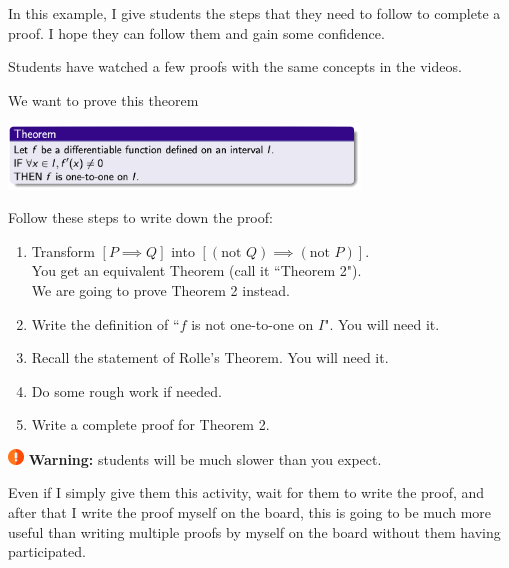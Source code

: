 \documentclass[11pt]{article}
\newcommand {\DS} [1] {${\displaystyle #1}$}
\newcommand{\vv}{\vspace{.5cm}}
\begin{document}
\begin{example}
In this example, I give students the steps that they need to follow to complete a proof.  I hope they can follow them and gain some confidence.
\begin{background}
Students have watched a few proofs with the same concepts in the videos. \end{background}
\begin{question}
We want to prove this theorem
\begin{center}
	\includegraphics[width=0.7\textwidth]{EX8}
	
	\vv
	
	\begin{minipage}{0.7\textwidth}
	Follow these steps to write down the proof:
	\begin{enumerate}
	\item Transform  \quad \DS{[P \implies Q]} \quad into \quad \DS{ [(\mbox{not } Q) \implies (\mbox{not } P)]}. \\
		You get an equivalent Theorem (call it ``Theorem 2").  \\
		We are going to prove Theorem 2 instead.
	\item  Write the definition of ``$f$ is not one-to-one on $I$".  You will need it.
	\item  Recall the statement of Rolle's Theorem.  You will need it.
	\item  Do some rough work if needed.
	\item  Write a complete proof for Theorem 2.
\end{enumerate}
	\end{minipage}

\end{center}
\includegraphics[height=12pt]{alert.png} \textbf{\textcolor{137cp3}{Warning:}} students will be much slower than you expect.

\end{question}
\begin{comments}
Even if I simply give them this activity, wait for them to write the proof, and after that I write the proof myself on the board, this is going to be much more useful than writing multiple proofs by myself on the board without them having participated.

\end{comments}
\end{example}
\end{document}
